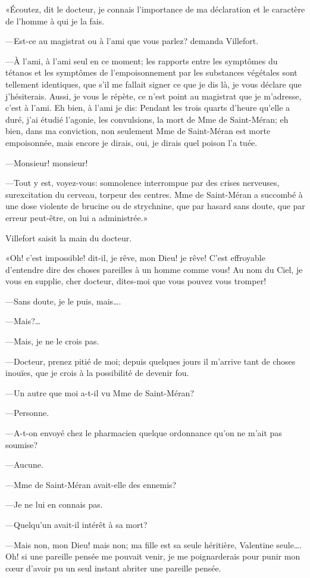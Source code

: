 «Écoutez, dit le docteur, je connais l'importance de ma déclaration et le caractère de l'homme à qui je la fais. 

—Est-ce au magistrat ou à l'ami que vous parlez? demanda Villefort. 

—À l'ami, à l'ami seul en ce moment; les rapports entre les symptômes du tétanos et les symptômes de l'empoisonnement par les substances végétales sont tellement identiques, que s'il me fallait signer ce que je dis là, je vous déclare que j'hésiterais. Aussi, je vous le répète, ce n'est point au magistrat que je m'adresse, c'est à l'ami. Eh bien, à l'ami je dis: Pendant les trois quarts d'heure qu'elle a duré, j'ai étudié l'agonie, les convulsions, la mort de Mme de Saint-Méran; eh bien, dans ma conviction, non seulement Mme de Saint-Méran est morte empoisonnée, mais encore je dirais, oui, je dirais quel poison l'a tuée. 

—Monsieur! monsieur! 

—Tout y est, voyez-vous: somnolence interrompue par des crises nerveuses, surexcitation du cerveau, torpeur des centres. Mme de Saint-Méran a succombé à une dose violente de brucine ou de strychnine, que par hasard sans doute, que par erreur peut-être, on lui a administrée.»  

Villefort saisit la main du docteur. 

«Oh! c'est impossible! dit-il, je rêve, mon Dieu! je rêve! C'est effroyable d'entendre dire des choses pareilles à un homme comme vous! Au nom du Ciel, je vous en supplie, cher docteur, dites-moi que vous pouvez vous tromper! 

—Sans doute, je le puis, mais\dots. 

—Mais?\dots 

—Mais, je ne le crois pas. 

—Docteur, prenez pitié de moi; depuis quelques jours il m'arrive tant de choses inouïes, que je crois à la possibilité de devenir fou. 

—Un autre que moi a-t-il vu Mme de Saint-Méran? 

—Personne. 

—A-t-on envoyé chez le pharmacien quelque ordonnance qu'on ne m'ait pas soumise? 

—Aucune. 

—Mme de Saint-Méran avait-elle des ennemis? 

—Je ne lui en connais pas. 

—Quelqu'un avait-il intérêt à sa mort?  

—Mais non, mon Dieu! mais non; ma fille est sa seule héritière, Valentine seule\dots. Oh! si une pareille pensée me pouvait venir, je me poignarderais pour punir mon cœur d'avoir pu un seul instant abriter une pareille pensée. 

